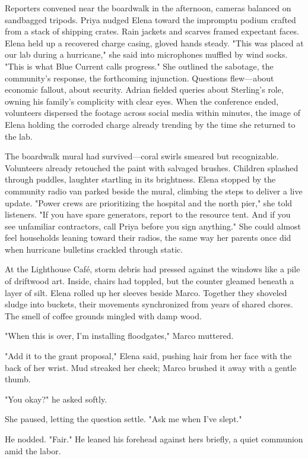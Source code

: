 \bigskip

Reporters convened near the boardwalk in the afternoon, cameras balanced on sandbagged tripods. Priya nudged Elena toward the impromptu podium crafted from a stack of shipping crates. Rain jackets and scarves framed expectant faces. Elena held up a recovered charge casing, gloved hands steady. "This was placed at our lab during a hurricane," she said into microphones muffled by wind socks. "This is what Blue Current calls progress." She outlined the sabotage, the community's response, the forthcoming injunction. Questions flew—about economic fallout, about security. Adrian fielded queries about Sterling's role, owning his family's complicity with clear eyes. When the conference ended, volunteers dispersed the footage across social media within minutes, the image of Elena holding the corroded charge already trending by the time she returned to the lab.

The boardwalk mural had survived—coral swirls smeared but recognizable. Volunteers already retouched the paint with salvaged brushes. Children splashed through puddles, laughter startling in its brightness. Elena stopped by the community radio van parked beside the mural, climbing the steps to deliver a live update. "Power crews are prioritizing the hospital and the north pier," she told listeners. "If you have spare generators, report to the resource tent. And if you see unfamiliar contractors, call Priya before you sign anything." She could almost feel households leaning toward their radios, the same way her parents once did when hurricane bulletins crackled through static.

At the Lighthouse Café, storm debris had pressed against the windows like a pile of driftwood art. Inside, chairs had toppled, but the counter gleamed beneath a layer of silt. Elena rolled up her sleeves beside Marco. Together they shoveled sludge into buckets, their movements synchronized from years of shared chores. The smell of coffee grounds mingled with damp wood.

"When this is over, I'm installing floodgates," Marco muttered.

"Add it to the grant proposal," Elena said, pushing hair from her face with the back of her wrist. Mud streaked her cheek; Marco brushed it away with a gentle thumb.

"You okay?" he asked softly.

She paused, letting the question settle. "Ask me when I've slept."

He nodded. "Fair." He leaned his forehead against hers briefly, a quiet communion amid the labor.


